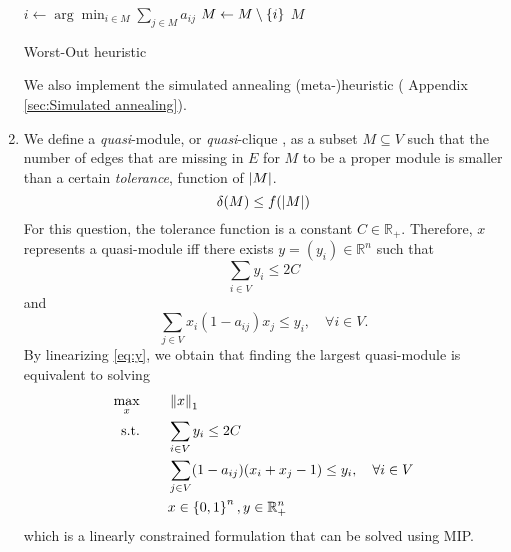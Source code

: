 \documentclass[a4paper, 12pt]{article}
\begin{document}
\begin{enumerate}[leftmargin=*]
        \begin{algorithm}[h]
            \begin{algorithmic}[1]
    				 
    					\State $i \gets \arg\min_{i \in M} \sum_{j \in M} a_{ij}$ 
    					\State $M \gets M \setminus \left\{i\right\}$ 
    				\EndWhile
    				\State \Return $M$
    			\EndFunction
    		\end{algorithmic}
    		\caption{Worst-Out heuristic}
		    \label{alg:worst-out}
		\end{algorithm}
		
		We also implement the simulated annealing (meta-)heuristic (\cf{} Appendix \ref{sec:Simulated annealing}).
		
		\item We define a \emph{quasi}-module, or \emph{quasi}-clique \cite{pattillo2013maximum}, as a subset $M \subseteq V$ such that the number of edges that are missing in $E$ for $M$ to be a proper module is smaller than a certain \emph{tolerance}, function of $\left|M\right|$.
		\begin{equation} \label{eq:tolerance}
		    \delta(M) \leq f(\left|M\right|)
		\end{equation}
		For this question, the tolerance function is a constant $C \in \mathbb{R}_+$. Therefore, $x$ represents a quasi-module iff there exists $y = (y_i) \in \mathbb{R}^n$ such that
		\begin{equation}
		    \sum_{i \in V} y_i \leq 2C
		\end{equation}
		and
		\begin{equation} \label{eq:y}
		    \sum_{j \in V} x_i (1 - a_{ij}) x_j \leq y_i, \quad \forall i \in V.
		\end{equation}
		By linearizing \eqref{eq:y}, we obtain that finding the largest quasi-module is equivalent to solving
		\begin{alignat*}{3}
            \max_{x} && \quad & \left\|x\right\|_1 \\
            \text{s.t.} &&& \sum_{i \in V} y_i \leq 2C \\
            &&& \sum_{j \in V} (1 - a_{ij}) (x_i + x_j - 1) \leq y_i, \quad \forall i \in V \\
            &&& x \in \left\{0, 1\right\}^n, y \in \mathbb{R}_+^n
        \end{alignat*}
        which is a linearly constrained formulation that can be solved using MIP.
        

\end{enumerate}
\end{document}

